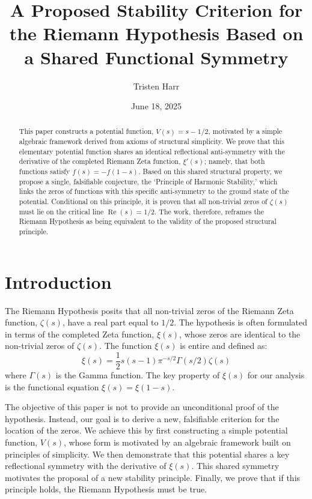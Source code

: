 \documentclass{amsart}
\theoremstyle{plain}
\theoremstyle{definition}
\theoremstyle{remark}
\DeclareMathOperator{\re}{Re}
\begin{document}
\title[A Proposed Stability Criterion for the RH]{A Proposed Stability Criterion for the Riemann Hypothesis Based on a Shared Functional Symmetry}
\author{Tristen Harr}
\date{June 18, 2025}
\address{Saint Charles, Missouri, United States}

\begin{abstract}
This paper constructs a potential function, $V(s) = s - 1/2$, motivated by a simple algebraic framework derived from axioms of structural simplicity. We prove that this elementary potential function shares an identical reflectional anti-symmetry with the derivative of the completed Riemann Zeta function, $\xi'(s)$; namely, that both functions satisfy $f(s) = -f(1-s)$. Based on this shared structural property, we propose a single, falsifiable conjecture, the `Principle of Harmonic Stability,' which links the zeros of functions with this specific anti-symmetry to the ground state of the potential. Conditional on this principle, it is proven that all non-trivial zeros of $\zeta(s)$ must lie on the critical line $\re(s)=1/2$. The work, therefore, reframes the Riemann Hypothesis as being equivalent to the validity of the proposed structural principle.
\end{abstract}

\maketitle

\section{Introduction}
The Riemann Hypothesis posits that all non-trivial zeros of the Riemann Zeta function, $\zeta(s)$, have a real part equal to $1/2$. The hypothesis is often formulated in terms of the completed Zeta function, $\xi(s)$, whose zeros are identical to the non-trivial zeros of $\zeta(s)$. The function $\xi(s)$ is entire and defined as:
$$ \xi(s) = \frac{1}{2}s(s-1)\pi^{-s/2}\Gamma(s/2)\zeta(s) $$
where $\Gamma(s)$ is the Gamma function. The key property of $\xi(s)$ for our analysis is the functional equation $\xi(s) = \xi(1-s)$.

The objective of this paper is not to provide an unconditional proof of the hypothesis. Instead, our goal is to derive a new, falsifiable criterion for the location of the zeros. We achieve this by first constructing a simple potential function, $V(s)$, whose form is motivated by an algebraic framework built on principles of simplicity. We then demonstrate that this potential shares a key reflectional symmetry with the derivative of $\xi(s)$. This shared symmetry motivates the proposal of a new stability principle. Finally, we prove that if this principle holds, the Riemann Hypothesis must be true.
\end{document}
